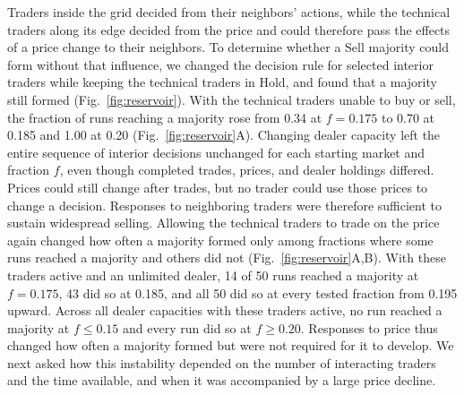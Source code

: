 Traders inside the grid decided from their neighbors' actions, while the
technical traders along its edge decided from the price and could therefore
pass the effects of a price change to their neighbors. To determine whether a Sell majority could
form without that influence, we changed the decision rule for selected
interior traders while keeping the technical traders in Hold, and found
that a majority still formed (Fig.~\ref{fig:reservoir}). With the technical
traders unable to buy or sell, the fraction of runs reaching a majority rose
from 0.34 at $f=0.175$ to 0.70 at 0.185 and 1.00 at 0.20
(Fig.~\ref{fig:reservoir}A). Changing dealer capacity left the entire
sequence of interior decisions unchanged for each starting market and
fraction $f$, even though completed trades, prices, and dealer holdings
differed. Prices could still change after trades, but no trader could use those
prices to change a decision. Responses to neighboring traders were therefore
sufficient to sustain widespread selling. Allowing the technical traders to
trade on the price again changed how often a majority formed only among
fractions where some runs reached a majority and others did not
(Fig.~\ref{fig:reservoir}A,B). With these traders active and an unlimited
dealer, 14 of 50 runs reached a majority at $f=0.175$, 43 did so at 0.185,
and all 50 did so at every tested fraction from 0.195 upward. Across all
dealer capacities with these traders active, no run reached a majority at
$f\leq0.15$ and every run did so at $f\geq0.20$. Responses to price thus
changed how often a majority formed but were not required for it to develop.
We next asked how this instability depended on the number of interacting
traders and the time available, and when it was accompanied by a large price
decline.



